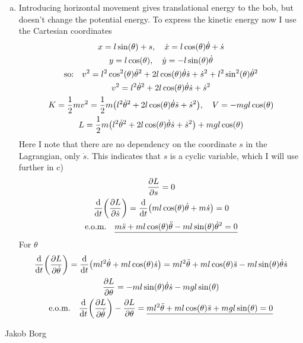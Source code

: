 \documentclass[11pt,a4paper]{report}
\newcounter{excount}[chapter]
\newenvironment{exercise}[1][]{\addtocounter{excount}{1} \noindent {\bf Problem
    \arabic{excount} \ \ #1}\hspace{2mm}}{\vspace{4mm}}
\newenvironment{solution}
    {\begin{tcolorbox}[title=Solution,halign lower=right,breakable]
    }
    {
    \tcblower Jakob Borg
    \end{tcolorbox}
	\vspace{5mm}
    }
\newcommand{\half}
{
\frac{1}{2}
}
\newcommand{\Leq}[1]
{
\dv{t}\qty(\pdv{L}{\dot{#1}}) - \pdv{L}{#1}
}
\newcommand{\Lpdv}[1]
{
\pdv{L}{#1}
}
\newcommand{\dtheta}
{
\dot{\theta}
}
\begin{document}
\begin{exercise}
\begin{solution}
\begin{enumerate}[a)]
\item Introducing horizontal movement gives translational energy to the bob, but doesn't change the potential energy. To express the kinetic energy now I use the Cartesian coordinates
\begin{gather*}
	x = l\sin(\theta) + s \qc  \dot{x} = l\cos(\theta)\dot{\theta} + \dot{s}
	\\
	y = l \cos(\theta) \qc  \dot{y} = -l\sin(\theta) \dot{\theta}
	\\
	\qq*{so:}  v^2 = l^2\cos[2](\theta)\dtheta^2 + 2l\cos(\theta)\dtheta\dot{s}+\dot{s}^2 + l^2 \sin[2](\theta)\dtheta^2
	\\
	v^2 = l^2\dtheta^2 + 2l\cos(\theta)\dtheta \dot{s}+ \dot{s}^2
	\\
	K = \half mv^2 = \half m \qty(l^2\dtheta^2 + 2l\cos(\theta)\dtheta \dot{s}+ \dot{s}^2) \qc V = -mgl\cos(\theta)
	\\
	L = \half m \qty( l^2	\dot{\theta}^2 + 2l\cos(\theta)\dtheta \dot{s} + \dot{s}^2 ) + mgl \cos(\theta)
\end{gather*}
Here I note that there are no dependency on the coordinate $s$ in the Lagrangian, only $\dot{s}$. This indicates that $s$ is a cyclic variable, which I will use further in c)
\begin{gather*}
\Lpdv{s} = 0 
\\
\dv{t}\qty(\Lpdv{\dot{s}}) = \dv{t}\qty( ml\cos(\theta)\dtheta + m\dot{s} ) =  0
\\
\qq*{e.o.m.} \underline{m\ddot{s} + ml \cos(\theta) \ddot{\theta} - ml \sin(\theta) \dtheta^2 = 0}
\end{gather*}
For $\theta$
\begin{gather}
\dv{t}\qty( \Lpdv{\dtheta} ) = \dv{t} \qty( ml^2 \dtheta + ml\cos(\theta) \dot{s} ) = ml^2\ddot{\theta} + ml\cos(\theta) \ddot{s} - ml \sin(\theta)\dtheta \dot{s} \notag
\\
\Lpdv{\theta} = -ml\sin(\theta)\dtheta \dot{s} -mgl\sin(\theta) \notag
\\
\qq*{e.o.m.}  \Leq{\theta} = \underline{ml^2\ddot{\theta} + ml\cos(\theta)\ddot{s} + mgl \sin(\theta) = 0} \label{eq:eomtheta}
\end{gather}


\end{enumerate}
\end{solution}
\end{exercise}
\end{document}
